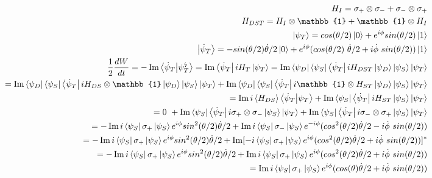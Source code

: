 \documentclass{article}
\begin{document}
	\begin{align*}
		H_{I} = \sigma_{+} \otimes \sigma_{-} + \sigma_{-} \otimes \sigma_{+} \\
		H_{DST} = H_{I} \otimes \mathbb{1} + \mathbb{1} \otimes H_{I} \\
		\ket{\psi_T} = cos(\theta / 2) \ket{0} + e^{i\phi} sin(\theta / 2) \ket{1}\\
		\ket{\dot{\psi}_T} = -sin(\theta / 2) \dot{\theta} / 2 \ket{0}
		+ e^{i\phi} (cos(\theta / 2) \ \dot{\theta}/2 + i \dot{\phi} \ sin(\theta/2)) \ket{1} \\
		\frac{1}{2}\frac{dW}{dt} = -\Im \bra{\dot{\psi}_T} \ket{\psi_T^{\text{\lightning}}}
		= \Im \bra{\dot{\psi}_T} i H_T \ket{\psi_T} = 
		\Im \bra{\psi_D} \bra{\psi_S} \bra{\dot{\psi}_T} i H_{DST}\ket{\psi_D}\ket{\psi_S}\ket{\psi_T} \\
		= \Im \bra{\psi_D} \bra{\psi_S} \bra{\dot{\psi}_T} i H_{DS} \otimes \mathbb{1} \ket{\psi_D}\ket{\psi_S}\ket{\psi_T}
		+ \Im \bra{\psi_D} \bra{\psi_S} \bra{\dot{\psi}_T} i \mathbb{1} \otimes H_{ST} \ket{\psi_D}\ket{\psi_S}\ket{\psi_T} \\
		= \Im i \expval{H_{DS}} \bra{\dot{\psi}_T} \ket{\psi_T} + \Im \bra{\psi_S} \bra{\dot{\psi}_T} i H_{ST} \ket{\psi_S}\ket{\psi_T} \\ = 0 \ + \Im \bra{\psi_S} \bra{\dot{\psi}_T} i \sigma_{+} \otimes \sigma_{-} \ket{\psi_S}\ket{\psi_T} + \Im \bra{\psi_S} \bra{\dot{\psi}_T} i \sigma_{-} \otimes \sigma_{+} \ket{\psi_S}\ket{\psi_T} \\
		= - \Im i \bra{\psi_S} \sigma_{+} \ket{\psi_S} e^{i\phi} sin^2(\theta/2) \dot{\theta}/2
		+ \Im i \bra{\psi_S} \sigma_{-} \ket{\psi_S} e^{-i\phi} (cos^2(\theta / 2) \dot{\theta}/2 - i \dot{\phi} \ sin(\theta/2)) \\
		= - \Im i \bra{\psi_S} \sigma_{+} \ket{\psi_S} e^{i\phi} sin^2(\theta/2) \dot{\theta}/2
		+ \Im [-i \bra{\psi_S} \sigma_{+} \ket{\psi_S} e^{i\phi} (cos^2(\theta / 2) \dot{\theta}/2 + i \dot{\phi} \ sin(\theta/2))]^* \\
		= - \Im i \bra{\psi_S} \sigma_{+} \ket{\psi_S} e^{i\phi} sin^2(\theta/2) \dot{\theta}/2
		+ \Im i \bra{\psi_S} \sigma_{+} \ket{\psi_S} e^{i\phi} (cos^2(\theta / 2) \dot{\theta}/2 + i \dot{\phi} \ sin(\theta/2)) \\
		= \Im i \bra{\psi_S} \sigma_{+} \ket{\psi_S} e^{i\phi} (cos(\theta) \dot{\theta}/2 + i \dot{\phi} \ sin(\theta/2))
	\end{align*}
	
\end{document}
